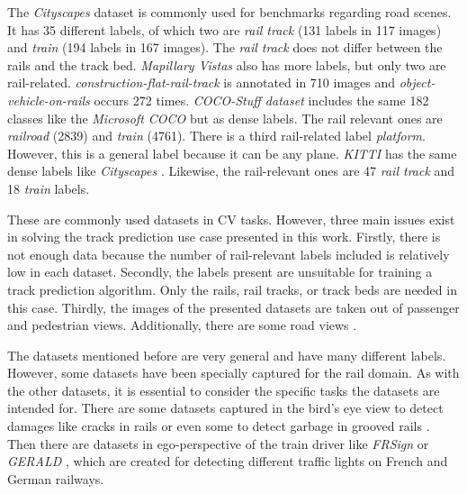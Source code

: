 \noindent The \textit{Cityscapes} dataset \cite{cityscapes2016} is commonly used for benchmarks regarding road scenes.
It has 35 different labels, of which two are \textit{rail track} (131 labels in 117 images) and \textit{train} (194 labels in 167 images).
The \textit{rail track} does not differ between the rails and the track bed.
\textit{Mapillary Vistas} \cite{mapillaryVistas2017} also has more labels, but only two are rail-related.
\textit{construction-flat-rail-track} is annotated in 710 images and \textit{object-vehicle-on-rails} occurs 272 times.
\textit{COCO-Stuff dataset} \cite{COCO-StuffDataset} includes the same 182 classes like the \textit{Microsoft COCO} \cite{Lin2014MicrosoftCC} but as dense labels.
The rail relevant ones are \textit{railroad} (2839) and \textit{train} (4761).
There is a third rail-related label \textit{platform}. However, this is a general label because it can be any plane.
\textit{KITTI} \cite{kittiDataset2018} has the same dense labels like \textit{Cityscapes} \cite{cityscapes2016}.
Likewise, the rail-relevant ones are 47 \textit{rail track} and 18 \textit{train} labels.

These are commonly used datasets in \ac{CV} tasks. However, three main issues exist in solving the track prediction use case presented in this work.
Firstly, there is not enough data because the number of rail-relevant labels included is relatively low in each dataset.
Secondly, the labels present are unsuitable for training a track prediction algorithm. Only the rails, rail tracks, or track beds are needed in this case.
Thirdly, the images of the presented datasets are taken out of passenger and pedestrian views. Additionally, there are some road views \cite{Hadded.2022}.

The datasets mentioned before are very general and have many different labels.
However, some datasets have been specially captured for the rail domain.
As with the other datasets, it is essential to consider the specific tasks the datasets are intended for.
There are some datasets captured in the bird's eye view to detect damages like cracks in rails \cite{rail5k2021} \cite{ma2024cross} or even some to detect garbage in grooved rails \cite{Huang_2021}. Then there are datasets in ego-perspective of the train driver like \textit{FRSign} \cite{Harb2020FRSignAL} or \textit{GERALD} \cite{leibner2023gerald}, which are created for detecting different traffic lights on French and German railways.

